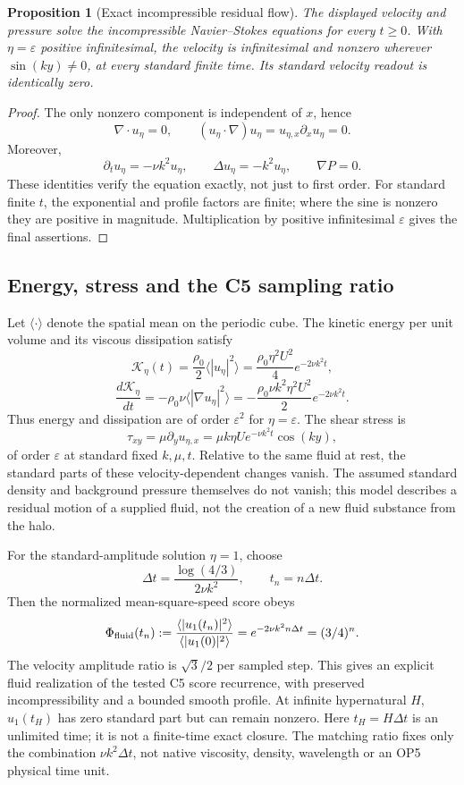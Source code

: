 \documentclass[11pt,a4paper]{article}
\newtheorem{proposition}{Proposition}
\begin{document}
\begin{proposition}[Exact incompressible residual flow]
The displayed velocity and pressure solve the incompressible Navier--Stokes
equations for every $t\ge0$. With $\eta=\varepsilon$ positive infinitesimal,
the velocity is infinitesimal and nonzero wherever $\sin(ky)\ne0$, at every
standard finite time. Its standard velocity readout is identically zero.
\end{proposition}
\begin{proof}
The only nonzero component is independent of $x$, hence
\[
\nabla\cdot u_\eta=0,\qquad
(u_\eta\cdot\nabla)u_\eta=u_{\eta,x}\partial_xu_\eta=0.
\]
Moreover,
\[
\partial_t u_\eta=-\nu k^2u_\eta,\qquad
\Delta u_\eta=-k^2u_\eta,\qquad \nabla P=0.
\]
These identities verify the equation exactly, not just to first order.
For standard finite $t$, the exponential and profile factors are finite;
where the sine is nonzero they are positive in magnitude. Multiplication by
positive infinitesimal $\varepsilon$ gives the final assertions.
\end{proof}

\subsection{Energy, stress and the C5 sampling ratio}
Let $\langle\cdot\rangle$ denote the spatial mean on the periodic cube.
The kinetic energy per unit volume and its viscous dissipation satisfy
\[
\mathcal K_\eta(t)=\frac{\rho_0}{2}\langle|u_\eta|^2\rangle
=\frac{\rho_0\eta^2U^2}{4}e^{-2\nu k^2t},
\]
\[
\frac{d\mathcal K_\eta}{dt}
=-\rho_0\nu\langle|\nabla u_\eta|^2\rangle
=-\frac{\rho_0\nu k^2\eta^2U^2}{2}e^{-2\nu k^2t}.
\]
Thus energy and dissipation are of order $\varepsilon^2$ for
$\eta=\varepsilon$. The shear stress is
\[
\tau_{xy}=\mu\partial_yu_{\eta,x}
=\mu k\eta U e^{-\nu k^2t}\cos(ky),
\]
of order $\varepsilon$ at standard fixed $k,\mu,t$. Relative to the
same fluid at rest, the standard parts of these velocity-dependent changes
vanish. The assumed standard density and background pressure themselves
do not vanish; this model describes a residual motion of a supplied fluid,
not the creation of a new fluid substance from the halo.

For the standard-amplitude solution $\eta=1$, choose
\[
\Delta t=\frac{\log(4/3)}{2\nu k^2},\qquad t_n=n\Delta t.
\]
Then the normalized mean-square-speed score obeys
\[
\Phi_{\rm fluid}(t_n)
:=\frac{\langle|u_1(t_n)|^2\rangle}
{\langle|u_1(0)|^2\rangle}
=e^{-2\nu k^2 n\Delta t}=(3/4)^n.
\]
The velocity amplitude ratio is $\sqrt3/2$ per sampled step. This gives
an explicit fluid realization of the tested C5 score recurrence, with
preserved incompressibility and a bounded smooth profile. At infinite
hypernatural $H$, $u_1(t_H)$ has zero standard part but can remain nonzero.
Here $t_H=H\Delta t$ is an unlimited time; it is not a finite-time exact
closure. The matching ratio fixes only the combination $\nu k^2\Delta t$,
not native viscosity, density, wavelength or an OP5 physical time unit.
\end{document}
